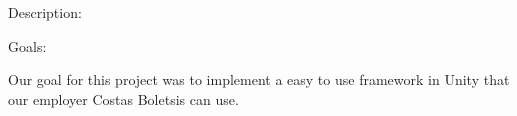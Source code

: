 Description:





Goals:

Our goal for this project was to implement a easy to use framework in Unity that our employer Costas Boletsis can use.
